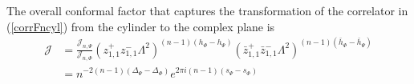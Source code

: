 \documentclass[11pt]{article}
\newcommand{\nn}{\nonumber}
\newcommand{\lb}{\left(}
\newcommand{\rb}{\right)}
\begin{document}
The overall conformal factor that captures the transformation of the correlator in (\ref{corrFncyl}) from the cylinder to the complex plane is
\begin{align}
\mathcal{J}&=\frac{\mathcal{J}_{n,\Psi}}{\mathcal{J}_{n,\Phi}}\lb z^+_{1,1}z^-_{1,1}\Lambda^2\rb^{(n-1)(h_\Phi-h_\Psi)}\lb\bar{z}^+_{1,1}\bar{z}^-_{1,1}\Lambda^2\rb^{(n-1)(\bar{h}_\Phi-\bar{h}_\Psi)}\nn\\
&=n^{-2(n-1)(\Delta_\Psi-\Delta_\Phi)}e^{2\pi i(n-1)(s_\Psi-s_\Phi)}
\end{align}
\end{document}
